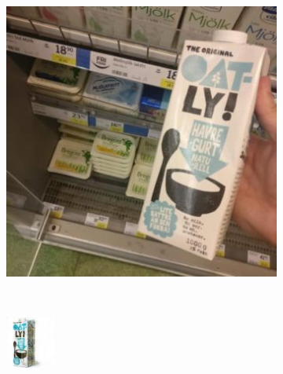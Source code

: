 \begin{figure}[t]
\begin{subfigure}[b]{0.18\textwidth}
		\caption{}
		\label{subfig:brown-cap-decoded}
	\end{subfigure} \\[1mm]
	\begin{subfigure}[b]{0.18\textwidth}
		\centering
		\includegraphics[width=\textwidth]{PaperA/decoded-image-figure/Oatly-Natural-Yoghurt_007.jpg}
		\caption{}
		\label{subfig:oatgurt-natural}
	\end{subfigure} ~
	\begin{subfigure}[b]{0.18\textwidth}
		\centering
		\includegraphics[width=\textwidth]{PaperA/decoded-image-figure/densenet_nov11/Oatly-Natural-Yoghurt_decoded.png}

\end{subfigure}
\end{figure}
